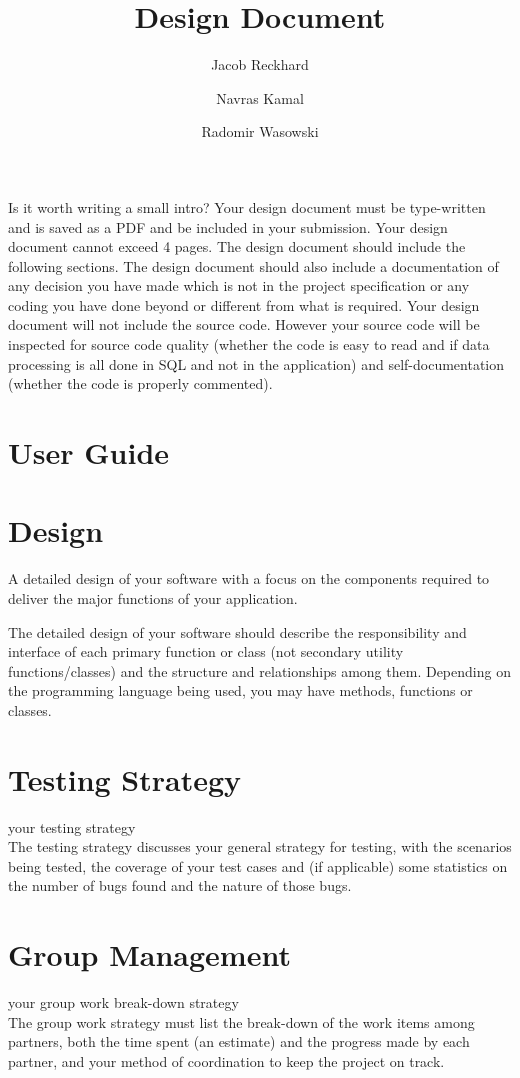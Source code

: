 \documentclass{article}
\title{Design Document}
\author{Jacob Reckhard \and Navras Kamal \and Radomir Wasowski}
\begin{document}
\maketitle

Is it worth writing a small intro? Your design document must be type-written and is saved as a PDF and be included in your submission. Your design document cannot exceed 4 pages. The design document should include the following sections. The design document should also include a documentation of any decision you have made which is not in the project specification or any coding you have done beyond or different from what is required. Your design document will not include the source code. However your source code will be inspected for source code quality (whether the code is easy to read and if data processing is all done in SQL and not in the application) and self-documentation (whether the code is properly commented).

\section{User Guide}


\section{Design}
A detailed design of your software with a focus on the components required to deliver the major functions of your application.

The detailed design of your software should describe the responsibility and interface of each primary function or class (not secondary utility functions/classes) and the structure and relationships among them. Depending on the programming language being used, you may have methods, functions or classes.

\section{Testing Strategy}
your testing strategy\\
The testing strategy discusses your general strategy for testing, with the scenarios being tested, the coverage of your test cases and (if applicable) some statistics on the number of bugs found and the nature of those bugs.

\section{Group Management}
your group work break-down strategy\\
The group work strategy must list the break-down of the work items among partners, both the time spent (an estimate) and the progress made by each partner, and your method of coordination to keep the project on track.
\end{document}
